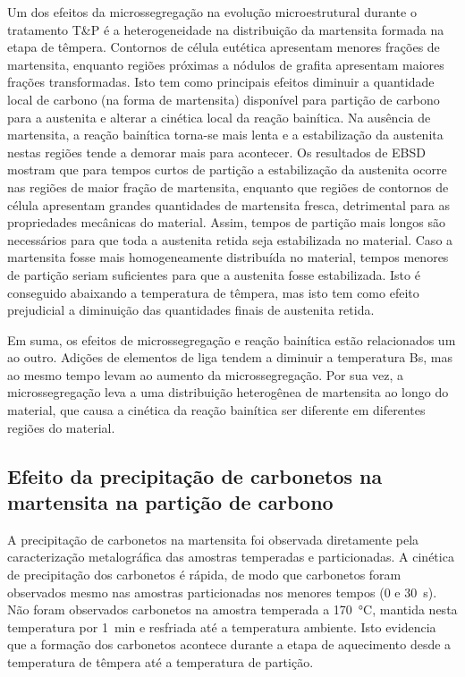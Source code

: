 Um dos efeitos da microssegregação na evolução microestrutural durante o tratamento T\&P é a heterogeneidade na distribuição da martensita formada na etapa de têmpera. Contornos de célula eutética apresentam menores frações de martensita, enquanto regiões próximas a nódulos de grafita apresentam maiores frações transformadas. Isto tem como principais efeitos diminuir a quantidade local de carbono (na forma de martensita) disponível para partição de carbono para a austenita e alterar a cinética local da reação bainítica. Na ausência de martensita, a reação bainítica torna-se mais lenta e a estabilização da austenita nestas regiões tende a demorar mais para acontecer. Os resultados de EBSD mostram que para tempos curtos de partição a estabilização da austenita ocorre nas regiões de maior fração de martensita, enquanto que regiões de contornos de célula apresentam grandes quantidades de martensita fresca, detrimental para as propriedades mecânicas do material. Assim, tempos de partição mais longos são necessários para que toda a austenita retida seja estabilizada no material. Caso a martensita fosse mais homogeneamente distribuída no material, tempos menores de partição seriam suficientes para que a austenita fosse estabilizada. Isto é conseguido abaixando a temperatura de têmpera, mas isto tem como efeito prejudicial a diminuição das quantidades finais de austenita retida.

Em suma, os efeitos de microssegregação e reação bainítica estão relacionados um ao outro. Adições de elementos de liga tendem a diminuir a temperatura Bs, mas ao mesmo tempo levam ao aumento da microssegregação. Por sua vez, a microssegregação leva a uma distribuição heterogênea de martensita ao longo do material, que causa a cinética da reação bainítica ser diferente em diferentes regiões do material. 



\subsection{Efeito da precipitação de carbonetos na martensita na partição de carbono}

A precipitação de carbonetos na martensita foi observada diretamente pela caracterização metalográfica das amostras temperadas e particionadas. A cinética de precipitação dos carbonetos é rápida, de modo que carbonetos foram observados mesmo nas amostras particionadas nos menores tempos (0 e 30~s). Não foram observados carbonetos na amostra temperada a \SI{170}{\degreeCelsius}, mantida nesta temperatura por 1~min e resfriada até a temperatura ambiente. Isto evidencia que a formação dos carbonetos acontece durante a etapa de aquecimento desde a temperatura de têmpera até a temperatura de partição.

